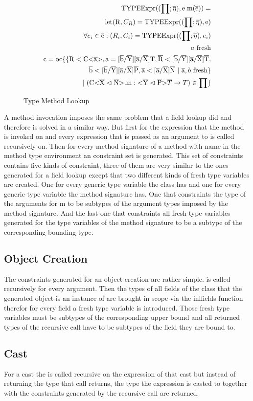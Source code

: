 \begin{figure}[H]
    \begin{align*}
        \text{TYPEExpr}((\prod; \overline{\eta}), \text{e.m}( \overline{\text{e}} )) = \\
        \text{let} ( \text{R}, C_R ) = \text{TYPEExpr}((\prod; \overline{\eta}), \text{e}) \\
        \forall{e_i} \in \overline{\text{e}} : ( R_i, C_i ) = \text{TYPEExpr}((\prod; \overline{\eta}), e_i) \\
        a \ \text{fresh} \\
        \text{c} = \text{oc} \{ \{ \text{R} < \text{C<} \overline{\text{a}} \text{>}, \text{a} = \text{[}\overline{\text{b}}/\overline{\text{Y}}\text{]}\text{[}\overline{\text{a}}/\overline{\text{X}}\text{]T}, \overline{\text{R}} < \text{[}\overline{\text{b}}/\overline{\text{Y}}\text{]}\text{[}\overline{\text{a}}/\overline{\text{X}}\text{]}\overline{\text{T}}, \\
        \overline{\text{b}} < \text{[}\overline{\text{b}}/\overline{\text{Y}}\text{]}\text{[}\overline{\text{a}}/\overline{\text{X}}\text{]}\overline{\text{P}}, \overline{\text{a}} < \text{[}\overline{\text{a}}/\overline{\text{X}}\text{]}\overline{\text{N}} \ | \ \overline{\text{a}}, b \ \text{fresh} \} \\
        | \ ( \text{C} \text{<} \overline{\text{X}} \vartriangleleft \overline{\text{N}} \text{>} \text{.m} : \text{<} \overline{\text{Y}} \vartriangleleft \overline{\text{P}} \text{>} \overline{T} \to T ) \in \prod \}
    \end{align*}
    \caption{Type Method Lookup}
    \label{type_method_lookup}
\end{figure}

A method invocation imposes the same problem that a field lookup did and therefore is solved in a similar way. But first for the
expression that the method  is invoked on and every expression that is passed as an argument to  
is called recursively on. Then for every method signature of a method with name  in the method type environment an constraint
set is generated. This set of constraints contains five kinds of constraint, three of them are very similar to the ones generated for a
field lookup except that two different kinds of fresh type variables are created. One for every generic type variable the class has and
one for every generic type variable the method signature has. One that constraints the type of the arguments for m to be subtypes of the
argument types imposed by the method signature. And the last one that constraints all fresh type variables generated for the type variables
of the method signature to be a subtype of the corresponding bounding type.

\subsection{Object Creation}

The constraints generated for an object creation are rather simple.  is called recursively for every argument. Then the types of all
fields of the class that the generated object is an instance of are brought in scope via the inl{fields} function therefor for every field a fresh type variable is introduced.
Those fresh type variables must be subtypes of the corresponding upper bound and all returned types of the recursive call have to be subtypes of the field they are bound to.

\subsection{Cast}

For a cast the  is called recursive on the expression of that cast but instead of returning the type that call returns, the type the expression is casted to together with the constraints generated by the recursive call are returned.
